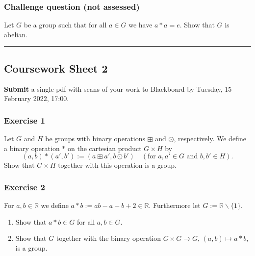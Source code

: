\documentclass[
  12pt,
  a4paper,
  twoside]{article}
\theoremstyle{plain}
\theoremstyle{definition}
\begin{document}
\hypertarget{challenge-question-not-assessed}{%
\subsubsection*{Challenge question (not assessed)}\label{challenge-question-not-assessed}}

Let \(G\) be a group such that for all \(a\in G\) we have \(a*a=e\). Show that \(G\) is
abelian.

\begin{center}\rule{0.5\linewidth}{0.5pt}\end{center}

\hypertarget{coursework-sheet-2}{%
\subsection{Coursework Sheet 2}\label{coursework-sheet-2}}

\textbf{Submit} a single pdf with scans of your work to Blackboard by Tuesday, 15 February 2022, 17:00.

\hypertarget{exercise-1-1}{%
\subsubsection*{Exercise 1}\label{exercise-1-1}}

Let \(G\) and \(H\) be groups with binary operations \(\boxplus\) and
\(\odot\), respectively. We define a binary operation \(\ast\)
on the cartesian product \(G \times H\) by
\[(a,b) \ast (a',b') := (a \boxplus a', b \odot b') \quad (\textrm{for }
a,a' \in G \textrm{ and } b,b' \in H).\] Show that \(G\times H\)
together with this operation is a group.

\hypertarget{exercise-2-1}{%
\subsubsection*{Exercise 2}\label{exercise-2-1}}

For \(a, b \in \mathbb{R}\) we define \(a \ast b := ab-a-b+2 \in \mathbb{R}\).
Furthermore let \(G:= \mathbb{R} \backslash \{1\}\).

\begin{enumerate}
\def\labelenumi{(\alph{enumi})}
\item
  Show that \(a \ast b \in G\) for all \(a, b \in G\).
\item
  Show that \(G\) together with the binary operation \(G \times G \rightarrow G\), \((a, b) \mapsto a \ast b\), is a group.
\end{enumerate}
\end{document}
